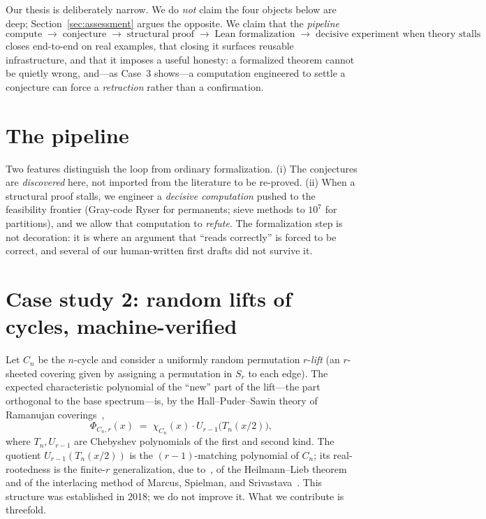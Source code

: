 \documentclass[11pt]{article}
\theoremstyle{remark}\newtheorem{remark}[theorem]{Remark}
\begin{document}
Our thesis is deliberately narrow. We do \emph{not} claim the four objects below
are deep; Section~\ref{sec:assessment} argues the opposite. We claim that the
\emph{pipeline}
\[
   \text{compute} \;\to\; \text{conjecture} \;\to\; \text{structural proof}
   \;\to\; \text{Lean formalization} \;\to\; \text{decisive experiment when theory
   stalls}
\]
closes end-to-end on real examples, that closing it surfaces reusable
infrastructure, and that it imposes a useful honesty: a formalized theorem cannot
be quietly wrong, and---as Case~3 shows---a computation engineered to
settle a conjecture can force a \emph{retraction} rather than a confirmation.

\section{The pipeline}\label{sec:pipeline}

Two features distinguish the loop from ordinary formalization. (i) The conjectures
are \emph{discovered} here, not imported from the literature to be re-proved.
(ii) When a structural proof stalls, we engineer a \emph{decisive computation}
pushed to the feasibility frontier (Gray-code Ryser for permanents; sieve methods
to $10^7$ for partitions), and we allow that computation to \emph{refute}. The
formalization step is not decoration: it is where an argument that ``reads
correctly'' is forced to be correct, and several of our human-written first drafts
did not survive it.

\section{Case study 2: random lifts of cycles, machine-verified}\label{sec:cycle}

Let $C_n$ be the $n$-cycle and consider a uniformly random permutation
$r$-\emph{lift} (an $r$-sheeted covering given by assigning a permutation in $S_r$
to each edge). The expected characteristic polynomial of the ``new'' part of the
lift---the part orthogonal to the base spectrum---is, by the
Hall--Puder--Sawin theory of Ramanujan coverings~\cite{HPS},
\begin{equation}\label{eq:cycle}
   \Phi_{C_n,r}(x) \;=\; \chi_{C_n}(x)\cdot U_{r-1}\!\big(T_n(x/2)\big),
\end{equation}
where $T_n,U_{r-1}$ are Chebyshev polynomials of the first and second kind. The
quotient $U_{r-1}(T_n(x/2))$ is the $(r-1)$-matching polynomial of $C_n$; its
real-rootedness is the finite-$r$ generalization, due to~\cite{HPS}, of the
Heilmann--Lieb theorem and of the interlacing method of Marcus, Spielman, and
Srivastava~\cite{MSS}. This structure was established in 2018; we do not improve
it. What we contribute is threefold.
\end{document}
